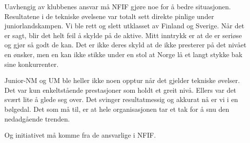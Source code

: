 Uavhengig av klubbenes ansvar må NFIF gjøre noe for å bedre situasjonen. Resultatene i de tekniske øvelsene var totalt sett direkte pinlige under juniorlandskampen. Vi ble rett og slett utklasset av Finland og Sverige. Når det er sagt, blir det helt feil å skylde på de aktive. Mitt inntrykk er at de er seriøse og gjør så godt de kan. Det er ikke deres skyld at de ikke presterer på det nivået en ønsker, men en kan ikke stikke under en stol at Norge lå et langt stykke bak sine konkurrenter.

Junior-NM og UM ble heller ikke noen opptur når det gjelder tekniske øvelser. Det var kun enkeltstående prestasjoner som holdt et greit nivå. Ellers var det svært lite å glede seg over. Det svinger resultatmessig og akkurat nå er vi i en bølgedal. Det som må til, er at hele organisasjonen tar et tak for å snu den nedadgående trenden.

Og initiativet må komme fra de ansvarlige i NFIF. \sluttmerke

